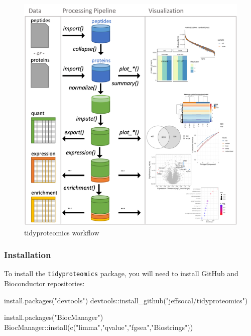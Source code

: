 \documentclass[
]{book}
\newenvironment{Shaded}{\begin{snugshade}}{\end{snugshade}}
\newcommand{\FunctionTok}[1]{\textcolor[rgb]{0.00,0.00,0.00}{#1}}
\newcommand{\NormalTok}[1]{#1}
\newcommand{\SpecialCharTok}[1]{\textcolor[rgb]{0.00,0.00,0.00}{#1}}
\newcommand{\StringTok}[1]{\textcolor[rgb]{0.31,0.60,0.02}{#1}}
\begin{document}
\begin{figure}

{\centering \includegraphics[width=9.17in]{images/10_001_tidyproteomics} 

}

\caption{\label{fig:10001}tidyproteomics workflow}\label{fig:10001}
\end{figure}

\hypertarget{installation-5}{%
\subsubsection*{Installation}\label{installation-5}}

To install the \texttt{tidyproteomics} package, you will need to install GitHub and Bioconductor repositories:

\begin{Shaded}
\begin{Highlighting}[]
\FunctionTok{install.packages}\NormalTok{(}\StringTok{"devtools"}\NormalTok{)}
\NormalTok{devtools}\SpecialCharTok{::}\FunctionTok{install\_github}\NormalTok{(}\StringTok{"jeffsocal/tidyproteomics"}\NormalTok{)}

\FunctionTok{install.packages}\NormalTok{(}\StringTok{"BiocManager"}\NormalTok{)}
\NormalTok{BiocManager}\SpecialCharTok{::}\FunctionTok{install}\NormalTok{(}\FunctionTok{c}\NormalTok{(}\StringTok{"limma"}\NormalTok{,}\StringTok{"qvalue"}\NormalTok{,}\StringTok{"fgsea"}\NormalTok{,}\StringTok{"Biostrings"}\NormalTok{))}
\end{Highlighting}
\end{Shaded}
\end{document}
